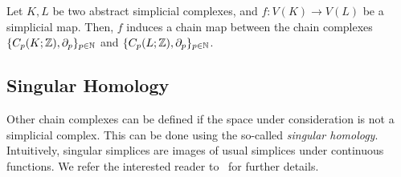
\begin{prop}
Let $K,L$ be two abstract simplicial complexes, and
$f:V(K)\rightarrow V(L)$ be a simplicial map.
Then, $f$ induces a chain map between the chain complexes $\{C_p(K;\mathbb{Z}),\partial_p\}_{p\in\mathbb{N}}$ and $\{C_p(L;\mathbb{Z}),\partial_p\}_{p\in\mathbb{N}}$.
\end{prop}





\subsection{Singular Homology}
\label{sec:singHomo}

Other chain complexes can be defined if the space under consideration is not a simplicial complex.
This can be done using the so-called {\em singular homology}. Intuitively, singular simplices are
images of usual simplices under continuous functions.
We refer the interested reader to~\cite{Munkres93} for further details. 

